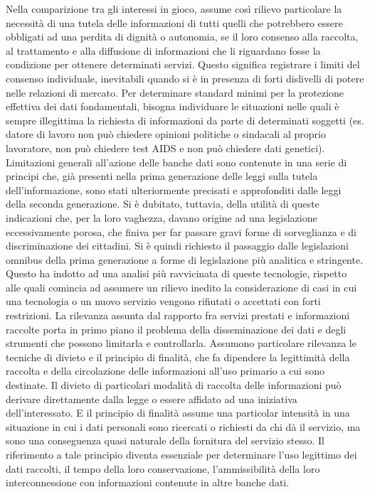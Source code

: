 Nella comparizione tra gli interessi in gioco, assume così rilievo particolare la necessità di una tutela delle informazioni di tutti quelli che potrebbero essere obbligati ad una perdita di dignità o autonomia, se il loro consenso alla raccolta, al trattamento e alla diffusione di informazioni che li riguardano fosse la condizione per ottenere determinati servizi.  Questo significa registrare i limiti del consenso individuale, inevitabili quando si è in presenza di forti dislivelli di potere nelle relazioni di mercato. Per determinare standard minimi per la protezione effettiva dei dati fondamentali, bisogna individuare le situazioni nelle quali è sempre illegittima la richiesta di informazioni da parte di determinati soggetti (es. datore di lavoro non può chiedere opinioni politiche o sindacali al proprio lavoratore, non può chiedere test AIDS e non può chiedere dati genetici). Limitazioni generali all’azione delle banche dati sono contenute in una serie di principi che, già presenti nella prima generazione delle leggi sulla tutela dell’informazione, sono stati ulteriormente precisati e approfonditi dalle leggi della seconda generazione. Si è dubitato, tuttavia, della utilità di queste indicazioni che, per la loro vaghezza, davano origine ad una legislazione eccessivamente porosa, che finiva per far passare gravi forme di sorveglianza e di discriminazione dei cittadini.
Si è quindi richiesto il passaggio dalle legislazioni omnibus della prima generazione a forme di legislazione più analitica e stringente. Questo ha indotto ad una analisi più ravvicinata di queste tecnologie, rispetto alle quali comincia ad assumere un rilievo inedito la considerazione di casi in cui una tecnologia o un nuovo servizio vengono rifiutati o accettati con forti restrizioni.
La rilevanza assunta dal rapporto fra servizi prestati e informazioni raccolte porta in primo piano il problema della disseminazione dei dati e degli strumenti che possono limitarla e controllarla. Assumono particolare rilevanza le tecniche di divieto e il principio di finalità, che fa dipendere la legittimità della raccolta e della circolazione delle informazioni all’uso primario a cui sono destinate. Il divieto di particolari modalità di raccolta delle informazioni può derivare direttamente dalla legge o essere affidato ad una iniziativa dell’interessato. E il principio di finalità assume una particolar intensità in una situazione in cui i dati personali sono ricercati o richiesti da chi dà il servizio, ma sono una conseguenza quasi naturale della fornitura del servizio stesso.
Il riferimento a tale principio diventa essenziale per determinare l’uso legittimo dei dati raccolti, il tempo della loro conservazione, l’ammissibilità della loro interconnessione con informazioni contenute in altre banche dati.
